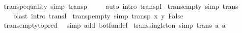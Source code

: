 \begin{isabellebody}
\endisatagproof
{\isafoldproof}%
%
\isadelimproof
\isanewline
%
\endisadelimproof
\isanewline
{}\isamarkupfalse%
\ transp{\isacharunderscore}{\kern0pt}equality\ {\isacharbrackleft}{\kern0pt}simp{\isacharbrackright}{\kern0pt}{\isacharcolon}{\kern0pt}\ {\isachardoublequoteopen}transp\ {\isacharparenleft}{\kern0pt}{\isacharequal}{\kern0pt}{\isacharparenright}{\kern0pt}{\isachardoublequoteclose}\isanewline
%
\isadelimproof
\ \ %
\endisadelimproof
%
\isatagproof
{}\isamarkupfalse%
\ {\isacharparenleft}{\kern0pt}auto\ intro{\isacharcolon}{\kern0pt}\ transpI{\isacharparenright}{\kern0pt}%
\endisatagproof
{\isafoldproof}%
%
\isadelimproof
\isanewline
%
\endisadelimproof
\isanewline
{}\isamarkupfalse%
\ trans{\isacharunderscore}{\kern0pt}empty\ {\isacharbrackleft}{\kern0pt}simp{\isacharbrackright}{\kern0pt}{\isacharcolon}{\kern0pt}\ {\isachardoublequoteopen}trans\ {\isacharbraceleft}{\kern0pt}{\isacharbraceright}{\kern0pt}{\isachardoublequoteclose}\isanewline
%
\isadelimproof
\ \ %
\endisadelimproof
%
\isatagproof
{}\isamarkupfalse%
\ {\isacharparenleft}{\kern0pt}blast\ intro{\isacharcolon}{\kern0pt}\ transI{\isacharparenright}{\kern0pt}%
\endisatagproof
{\isafoldproof}%
%
\isadelimproof
\isanewline
%
\endisadelimproof
\isanewline
{}\isamarkupfalse%
\ transp{\isacharunderscore}{\kern0pt}empty\ {\isacharbrackleft}{\kern0pt}simp{\isacharbrackright}{\kern0pt}{\isacharcolon}{\kern0pt}\ {\isachardoublequoteopen}transp\ {\isacharparenleft}{\kern0pt}{\isasymlambda}x\ y{\isachardot}{\kern0pt}\ False{\isacharparenright}{\kern0pt}{\isachardoublequoteclose}\isanewline
%
\isadelimproof
\ \ %
\endisadelimproof
%
\isatagproof
{}\isamarkupfalse%
\ trans{\isacharunderscore}{\kern0pt}empty{\isacharbrackleft}{\kern0pt}to{\isacharunderscore}{\kern0pt}pred{\isacharbrackright}{\kern0pt}\ \isamarkupfalse%
\ {\isacharparenleft}{\kern0pt}simp\ add{\isacharcolon}{\kern0pt}\ bot{\isacharunderscore}{\kern0pt}fun{\isacharunderscore}{\kern0pt}def{\isacharparenright}{\kern0pt}%
\endisatagproof
{\isafoldproof}%
%
\isadelimproof
\isanewline
%
\endisadelimproof
\isanewline
{}\isamarkupfalse%
\ trans{\isacharunderscore}{\kern0pt}singleton\ {\isacharbrackleft}{\kern0pt}simp{\isacharbrackright}{\kern0pt}{\isacharcolon}{\kern0pt}\ {\isachardoublequoteopen}trans\ {\isacharbraceleft}{\kern0pt}{\isacharparenleft}{\kern0pt}a{\isacharcomma}{\kern0pt}\ a{\isacharparenright}{\kern0pt}{\isacharbraceright}{\kern0pt}{\isachardoublequoteclose}\isanewline
%
\isadelimproof
\ \ %
\endisadelimproof

\end{isabellebody}
